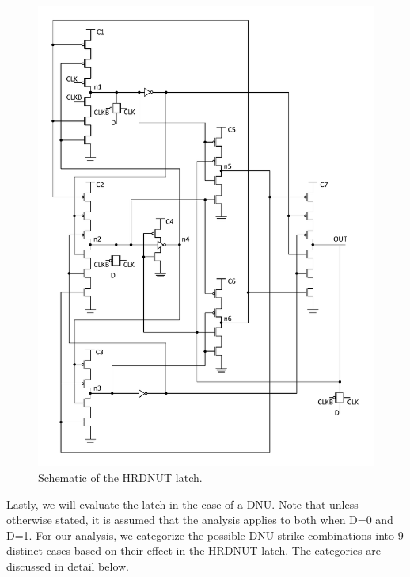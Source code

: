 \begin{figure}[!tbp]
	\centering
	\includegraphics[trim = 0mm 6mm 0mm 5mm, clip, width=\linewidth]{Figures/HRDNUT}
	\caption{Schematic of the HRDNUT latch.}
	\label{HRDNUT}
\end{figure} 

Lastly, we will evaluate the latch in the case of a DNU. Note that unless otherwise stated, it is assumed that the analysis applies to both when D=0 and D=1. For our analysis, we categorize the possible DNU strike combinations into 9 distinct cases based on their effect in the HRDNUT latch. The categories are discussed in detail below. 

